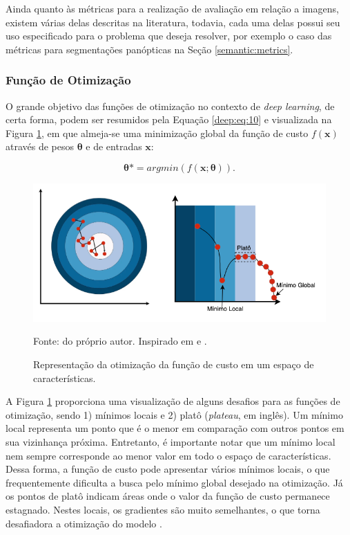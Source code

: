 Ainda quanto às métricas para a realização de avaliação em relação a imagens, existem várias delas descritas na literatura, todavia,  cada uma delas possui seu uso especificado para o problema que deseja resolver, por exemplo o caso das métricas para segmentações panópticas na Seção \ref{semantic:metrics}.


\subsubsection{Função de Otimização}
\label{deep:optimization}

O grande objetivo das funções de otimização no contexto de \textit{deep learning}, de certa forma, podem ser resumidos pela Equação \ref{deep:eq:10} e visualizada na Figura \ref{deep:fig:otimizacao}, em que almeja-se uma minimização global da função de custo $f(\boldsymbol{x})$ através de pesos $\boldsymbol{\theta}$ e de entradas $\boldsymbol{x}$:

\begin{equation}
    \label{deep:eq:10}
    \boldsymbol{\theta}* = argmin(f(\boldsymbol{x};\boldsymbol{\theta})).
\end{equation}

\begin{figure}[H]
    \centering
    \caption{Representação da otimização da função de custo em um espaço de características.}
    \includegraphics[width=1\linewidth]{recursos/imagens/deep/funcao_otimizacao.png}
    \label{deep:fig:otimizacao}

    Fonte: do próprio autor. Inspirado em \cite{MontesinosLopez2022ArtificialOutcomes} e \cite{Geron2017Hands-onSystems}.
\end{figure}

A Figura \ref{deep:fig:otimizacao} proporciona uma visualização de alguns desafios para as funções de otimização, sendo 1) mínimos locais e 2) platô (\textit{plateau}, em inglês). Um mínimo local representa um ponto que é o menor em comparação com outros pontos em sua vizinhança próxima. Entretanto, é importante notar que um mínimo local nem sempre corresponde ao menor valor em todo o espaço de características. Dessa forma, a função de custo pode apresentar vários mínimos locais, o que frequentemente dificulta a busca pelo mínimo global desejado na otimização\citep{Goodfellow2016}. Já os pontos de platô indicam áreas onde o valor da função de custo permanece estagnado. Nestes locais, os gradientes são muito semelhantes, o que torna desafiadora a otimização do modelo \cite{Goodfellow2016}.

